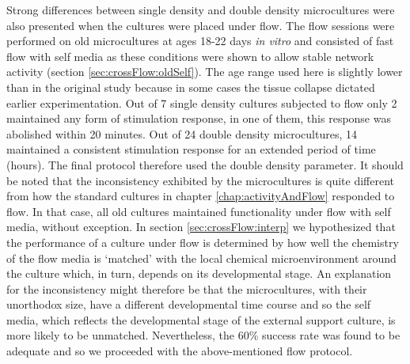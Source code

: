    Strong differences between single density and double density microcultures were also presented when the cultures were placed under flow. The flow sessions were performed on old microcultures at ages 18-22 days \textit{in vitro} and consisted of fast flow with self media as these conditions were shown to allow stable network activity (section \ref{sec:crossFlow:oldSelf}). The age range used here is slightly lower than in the original study because in some cases the tissue collapse dictated earlier experimentation. Out of 7 single density cultures subjected to flow only 2 maintained any form of stimulation response, in one of them, this response was abolished within 20 minutes. Out of 24 double density microcultures, 14 maintained a consistent stimulation response for an extended period of time (hours). The final protocol therefore used the double density parameter. It should be noted that the inconsistency exhibited by the microcultures is quite different from how the standard cultures in chapter \ref{chap:activityAndFlow} responded to flow. In that case, all old cultures maintained functionality under flow with self media, without exception. In section \ref{sec:crossFlow:interp} we hypothesized that the performance of a culture under flow is determined by how well the chemistry of the flow media is `matched' with the local chemical microenvironment around the culture which, in turn, depends on its developmental stage. An explanation for the inconsistency might therefore be that the microcultures, with their unorthodox size, have a different developmental time course and so the self media, which reflects the developmental stage of the external support culture, is more likely to be unmatched. Nevertheless, the 60\% success rate was found to be adequate and so we proceeded with the above-mentioned flow protocol.

